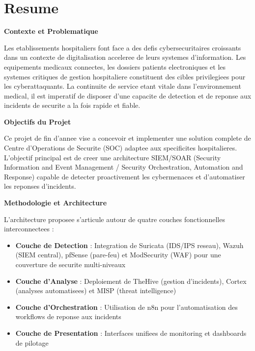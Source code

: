 \chapter*{Resume}

\vspace{1cm}

\textbf{Contexte et Problematique}

Les etablissements hospitaliers font face a des defis cybersecuritaires croissants dans un contexte de digitalisation acceleree de leurs systemes d'information. Les equipements medicaux connectes, les dossiers patients electroniques et les systemes critiques de gestion hospitaliere constituent des cibles privilegiees pour les cyberattaquants. La continuite de service etant vitale dans l'environnement medical, il est imperatif de disposer d'une capacite de detection et de reponse aux incidents de securite a la fois rapide et fiable.

\vspace{0.5cm}

\textbf{Objectifs du Projet}

Ce projet de fin d'annee vise a concevoir et implementer une solution complete de Centre d'Operations de Securite (SOC) adaptee aux specificites hospitalieres. L'objectif principal est de creer une architecture SIEM/SOAR (Security Information and Event Management / Security Orchestration, Automation and Response) capable de detecter proactivement les cybermenaces et d'automatiser les reponses d'incidents.

\vspace{0.5cm}

\textbf{Methodologie et Architecture}

L'architecture proposee s'articule autour de quatre couches fonctionnelles interconnectees :

\begin{itemize}
    \item \textbf{Couche de Detection} : Integration de Suricata (IDS/IPS reseau), Wazuh (SIEM central), pfSense (pare-feu) et ModSecurity (WAF) pour une couverture de securite multi-niveaux
    \item \textbf{Couche d'Analyse} : Deploiement de TheHive (gestion d'incidents), Cortex (analyses automatisees) et MISP (threat intelligence)
    \item \textbf{Couche d'Orchestration} : Utilisation de n8n pour l'automatisation des workflows de reponse aux incidents
    \item \textbf{Couche de Presentation} : Interfaces unifiees de monitoring et dashboards de pilotage
\end{itemize}

